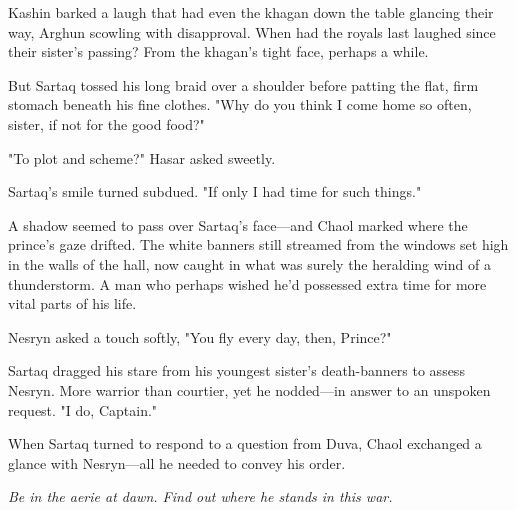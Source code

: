 Kashin barked a laugh that had even the khagan down the table glancing their way, Arghun scowling with disapproval. When had the royals last laughed since their sister's passing? From the khagan's tight face, perhaps a while.

But Sartaq tossed his long braid over a shoulder before patting the flat, firm stomach beneath his fine clothes. "Why do you think I come home so often, sister, if not for the good food?"

"To plot and scheme?" Hasar asked sweetly.

Sartaq's smile turned subdued. "If only I had time for such things."

A shadow seemed to pass over Sartaq's face---and Chaol marked where the prince's gaze drifted. The white banners still streamed from the windows set high in the walls of the hall, now caught in what was surely the heralding wind of a thunderstorm. A man who perhaps wished he'd possessed extra time for more vital parts of his life.

Nesryn asked a touch softly, "You fly every day, then, Prince?"

Sartaq dragged his stare from his youngest sister's death-banners to assess Nesryn. More warrior than courtier, yet he nodded---in answer to an unspoken request. "I do, Captain."

When Sartaq turned to respond to a question from Duva, Chaol exchanged a glance with Nesryn---all he needed to convey his order.

\emph{Be in the aerie at dawn. Find out where he stands in this war.}


